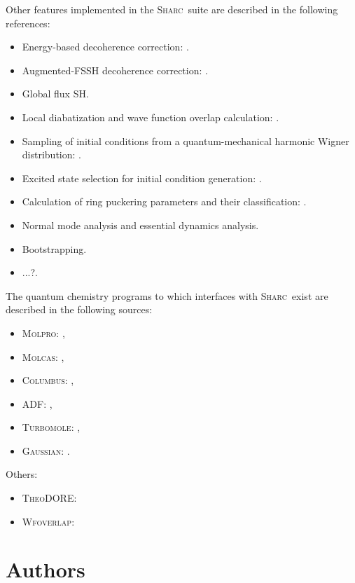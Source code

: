 \documentclass[a4paper,10pt,DIV=15,openany,twoside=false]{scrbook}
\newcommand{\sharc}{\textsc{Sharc}}
\newcommand{\todo}[1]{\textcolor{RL}{#1}}
\begin{document}
Other features implemented in the \sharc\ suite are described in the following references:
\begin{itemize}
  \item Energy-based decoherence correction: \cite{Granucci2007JCP}.
  \item Augmented-FSSH decoherence correction: \cite{Subotnik_todo}.
  \item \todo{Global flux SH}.
  \item Local diabatization and wave function overlap calculation: \cite{Granucci2001JCP, Plasser2012JCP, Plasser2016JCTC}.
  \item Sampling of initial conditions from a quantum-mechanical harmonic Wigner distribution: \cite{Dahl1988JCP, Schinke1995}.
  \item Excited state selection for initial condition generation: \cite{Barbatti2011}.
  \item Calculation of ring puckering parameters and their classification: \cite{Cremer1975JACS, Boeyens1976JCMS}.
  \item \todo{Normal mode analysis and essential dynamics analysis}.
  \item \todo{Bootstrapping}.
  \item \todo{...?}.
\end{itemize}

The quantum chemistry programs to which interfaces with \sharc\ exist are described in the following sources:
\begin{itemize}
  \item \textsc{Molpro}: \cite{Werner2012WCMS, Werner2012},
  \item \textsc{Molcas}: \cite{Karlstrom2003CMS, Aquilante2010JCC, Aquilante2015JCC},
  \item \textsc{Columbus}: \cite{Lischka2011WCMS, Lischka2012, Yabushita1999JPCA, Mai2014JCP_reindex},
  \item \textsc{ADF}: \cite{adf_todo},
  \item \textsc{Turbomole}: \cite{turbomole_todo},
  \item \textsc{Gaussian}: \cite{gaussian_todo}.
\end{itemize}

\todo{Others:}
\begin{itemize}
  \item \todo{\textsc{TheoDORE}: }
  \item \todo{\textsc{Wfoverlap}: }
\end{itemize}


\section{Authors}
\end{document}
